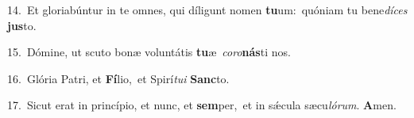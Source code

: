 {\numbfont\textcolor{\numbcolor}{14.}}~Et gloriabúntur in te omnes, qui díligunt nomen \textbf{tu}\-um:~\star quóniam tu bene\-\textit{dí}\-\textit{ces} \textbf{jus}\-to.\par
{\numbfont\textcolor{\numbcolor}{15.}}~Dómine, ut scuto bonæ voluntátis \textbf{tu}\-æ~\star \textit{co}\-\textit{ro}\textbf{nás}ti nos.\par
{\numbfont\textcolor{\numbcolor}{16.}}~Glória Patri, et \textbf{Fí}\-lio,~\star et Spirí\-\textit{tu}\-\textit{i} \textbf{Sanc}\-to.\par
{\numbfont\textcolor{\numbcolor}{17.}}~Sicut erat in princípio, et nunc, et \textbf{sem}\-per,~\star et in sǽcula sæcu\-\textit{ló}\-\textit{rum}. \textbf{A}\-men.\par
